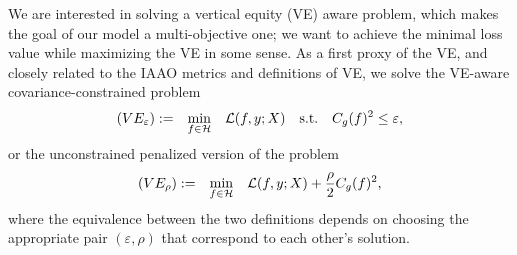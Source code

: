 \documentclass[11pt]{article}
\theoremstyle{plain}
\theoremstyle{definition}
\newcommand{\R}{\mathbb{R}}
\newcommand{\1}{\mathbf{1}}
\newcommand{\Y}{\mathcal{Y}}
\newcommand{\X}{\mathcal{X}}
\renewcommand{\L}{\mathcal{L}}
\renewcommand{\H}{\mathcal{H}}
\renewcommand{\R}{\mathbb{R}}
\begin{document}
We are interested in solving a vertical equity (VE) aware problem, which makes the goal of our model a multi-objective one; we want to achieve the minimal loss value while maximizing the VE in some sense. As a first proxy of the VE,  and closely related to the IAAO metrics and definitions of VE, we solve the VE-aware covariance-constrained problem 
\begin{align}
    {\everymath{\displaystyle}
    \begin{array}{cccccc}
    (VE_{\varepsilon}):= &  \min_{f\in \H}  &  \L(f,y;X) & \text{s.t.} & C_g(f)^2 \leq \varepsilon,
    \end{array}
    }
    \label{opt:general_learner_constrained}
\end{align}
or the unconstrained penalized version of the problem  
\begin{align}
    {\everymath{\displaystyle}
    \begin{array}{ccccccc}
    (VE_{\rho}):= &  \min_{f\in \H}  &  \L(f,y;X) + \frac{\rho}{2} C_g(f)^2,
    \end{array}
    }
    \label{opt:general_learner_penalized}
\end{align}
where the equivalence between the two definitions depends on choosing the appropriate pair $(\varepsilon, \rho)$ that correspond to each other's solution.




\end{document}
